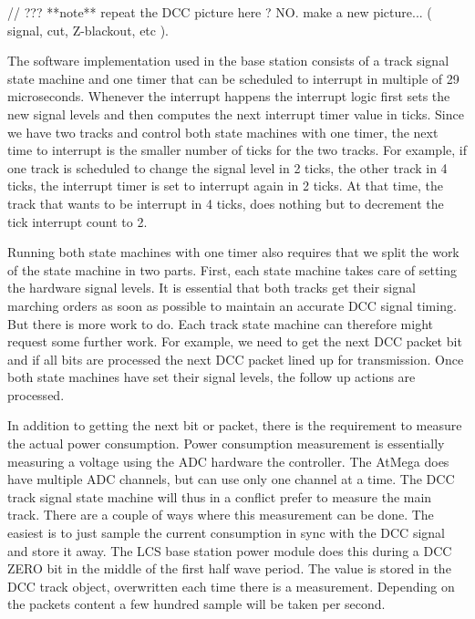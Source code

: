// ??? **note** repeat the DCC picture here ? NO. make a new picture... ( signal, cut, Z-blackout, etc ).

The software implementation used in the base station consists of a track signal state machine and one timer that can be scheduled to interrupt in multiple of 29 microseconds. Whenever the interrupt happens  the interrupt logic first sets the new signal levels and then computes the next interrupt timer value in ticks. Since we have two tracks and control both state machines with one timer, the next time to interrupt is the smaller number of ticks for the two tracks. For example, if one track is scheduled to change the signal level in 2 ticks, the other track in 4 ticks, the interrupt timer is set to interrupt again in 2 ticks. At that time, the track that wants to be interrupt in 4 ticks, does nothing but to decrement the tick interrupt count to 2.

Running both state machines with one timer also requires that we split the work of the state machine in two parts. First, each state machine takes care of setting the hardware signal levels. It is essential that both tracks get their signal marching orders as soon as possible to maintain an accurate DCC signal timing. But there is more work to do. Each track state machine can therefore might request some further work. For example, we need to get the next DCC packet bit and if all bits are processed the next DCC packet lined up for transmission. Once both state machines have set their signal levels, the follow up actions are processed.

In addition to getting the next bit or packet, there is the requirement to measure the actual power consumption. Power consumption measurement is essentially measuring a voltage using the ADC hardware the controller. The AtMega does have multiple ADC channels, but can use only one channel at a time. The DCC track signal state machine will thus in a conflict prefer to measure the main track. There are a couple of ways where this measurement can be done. The easiest is to just sample the current consumption in sync with the DCC signal and store it away. The LCS base station power module does this during a DCC ZERO bit in the middle of the first half wave period. The value is stored in the DCC track object, overwritten each time there is a measurement. Depending on the packets content a few hundred sample will be taken per second.

